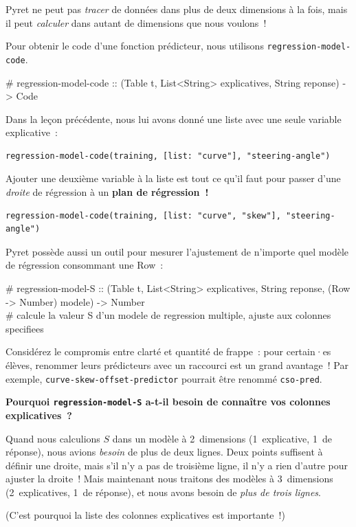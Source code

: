 \documentclass[12pt,a4paper]{article}
\newcommand{\contrat}[1]{%
  \begin{contractbox}
    \ttfamily #1
  \end{contractbox}
}
\begin{document}
\begin{keypointbox}
  Pyret ne peut pas \emph{tracer} de données dans plus de deux dimensions à la fois, mais il peut \emph{calculer} dans autant de dimensions que nous voulons~!

  Pour obtenir le code d'une fonction prédicteur, nous utilisons \texttt{regression-model-code}.

  \contrat{\# regression-model-code :: (Table t, List<String> explicatives, String reponse) -> Code}

  Dans la leçon précédente, nous lui avons donné une liste avec une seule variable explicative~:
  \begin{lstlisting}
regression-model-code(training, [list: "curve"], "steering-angle")
  \end{lstlisting}

  Ajouter une deuxième variable à la liste est tout ce qu'il faut pour passer d'une \emph{droite} de régression à un \textbf{plan de régression~!}
  \begin{lstlisting}
regression-model-code(training, [list: "curve", "skew"], "steering-angle")
  \end{lstlisting}

  Pyret possède aussi un outil pour mesurer l'ajustement de n'importe quel modèle de régression consommant une Row~:

  \contrat{\# regression-model-S :: (Table t, List<String> explicatives, String reponse, (Row -> Number) modele) -> Number\\
\# calcule la valeur S d'un modele de regression multiple, ajuste aux colonnes specifiees}
\end{keypointbox}

\begin{instructornotes}
  Considérez le compromis entre clarté et quantité de frappe~: pour certain·es élèves, renommer leurs prédicteurs avec un raccourci est un grand avantage~! Par exemple, \texttt{curve\allowbreak-skew\allowbreak-offset\allowbreak-predictor} pourrait être renommé \texttt{cso-pred}.

  \vspace{0.3em}
  \textbf{Pourquoi \texttt{regression-model-S} a-t-il besoin de connaître vos colonnes explicatives~?}

  Quand nous calculions $S$ dans un modèle à 2~dimensions (1~explicative, 1~de réponse), nous avions \emph{besoin} de plus de deux lignes. Deux points suffisent à définir une droite, mais s'il n'y a pas de troisième ligne, il n'y a rien d'autre pour ajuster la droite~! Mais maintenant nous traitons des modèles à 3~dimensions (2~explicatives, 1~de réponse), et nous avons besoin de \emph{plus de trois lignes}.

  (C'est pourquoi la liste des colonnes explicatives est importante~!)
\end{instructornotes}
\end{document}
